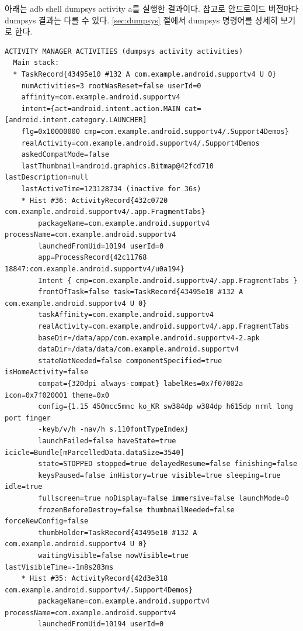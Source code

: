 아래는 adb shell dumpsys activity a를 실행한 결과이다. 참고로 안드로이드 버전마다 dumpsys 결과는 다를 수 있다. \ref{sec:dumpsys} 절에서 dumpsys 명령어를 상세히 보기로 한다.
\begin{lstlisting}[frame=single]
ACTIVITY MANAGER ACTIVITIES (dumpsys activity activities)
  Main stack:
  * TaskRecord{43495e10 #132 A com.example.android.supportv4 U 0}
    numActivities=3 rootWasReset=false userId=0
    affinity=com.example.android.supportv4
    intent={act=android.intent.action.MAIN cat=[android.intent.category.LAUNCHER] 
    flg=0x10000000 cmp=com.example.android.supportv4/.Support4Demos}
    realActivity=com.example.android.supportv4/.Support4Demos
    askedCompatMode=false
    lastThumbnail=android.graphics.Bitmap@42fcd710 lastDescription=null
    lastActiveTime=123128734 (inactive for 36s)
    * Hist #36: ActivityRecord{432c0720 com.example.android.supportv4/.app.FragmentTabs}
        packageName=com.example.android.supportv4 processName=com.example.android.supportv4
        launchedFromUid=10194 userId=0
        app=ProcessRecord{42c11768 18847:com.example.android.supportv4/u0a194}
        Intent { cmp=com.example.android.supportv4/.app.FragmentTabs }
        frontOfTask=false task=TaskRecord{43495e10 #132 A com.example.android.supportv4 U 0}
        taskAffinity=com.example.android.supportv4
        realActivity=com.example.android.supportv4/.app.FragmentTabs
        baseDir=/data/app/com.example.android.supportv4-2.apk
        dataDir=/data/data/com.example.android.supportv4
        stateNotNeeded=false componentSpecified=true isHomeActivity=false
        compat={320dpi always-compat} labelRes=0x7f07002a icon=0x7f020001 theme=0x0
        config={1.15 450mcc5mnc ko_KR sw384dp w384dp h615dp nrml long port finger 
        -keyb/v/h -nav/h s.110fontTypeIndex}
        launchFailed=false haveState=true icicle=Bundle[mParcelledData.dataSize=3540]
        state=STOPPED stopped=true delayedResume=false finishing=false
        keysPaused=false inHistory=true visible=true sleeping=true idle=true
        fullscreen=true noDisplay=false immersive=false launchMode=0
        frozenBeforeDestroy=false thumbnailNeeded=false forceNewConfig=false
        thumbHolder=TaskRecord{43495e10 #132 A com.example.android.supportv4 U 0}
        waitingVisible=false nowVisible=true lastVisibleTime=-1m8s283ms
    * Hist #35: ActivityRecord{42d3e318 com.example.android.supportv4/.Support4Demos}
        packageName=com.example.android.supportv4 processName=com.example.android.supportv4
        launchedFromUid=10194 userId=0

\end{lstlisting}
